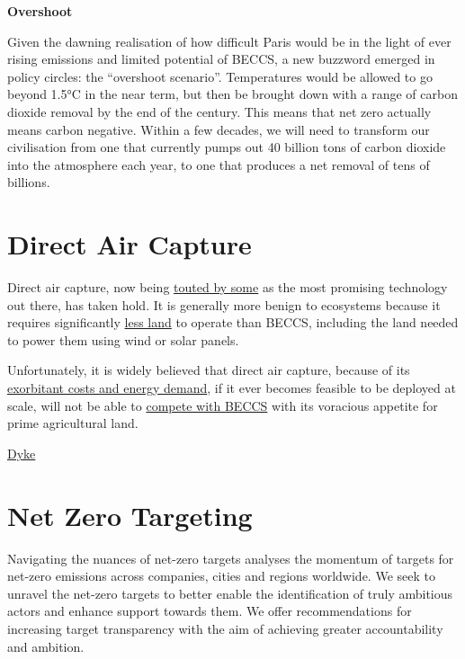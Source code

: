 \documentclass[
]{book}
\begin{document}
\textbf{Overshoot}

Given the dawning realisation of how difficult Paris would be in the light of ever rising emissions and limited potential of BECCS, a new buzzword emerged in policy circles: the ``overshoot scenario''. Temperatures would be allowed to go beyond 1.5°C in the near term, but then be brought down with a range of carbon dioxide removal by the end of the century. This means that net zero actually means carbon negative. Within a few decades, we will need to transform our civilisation from one that currently pumps out 40 billion tons of carbon dioxide into the atmosphere each year, to one that produces a net removal of tens of billions.

\hypertarget{direct-air-capture}{%
\section{Direct Air Capture}\label{direct-air-capture}}

Direct air capture, now being \href{https://www.wri.org/blog/2020/03/to-unlock-the-potential-of-direct-air-capture-we-must-invest-now}{touted by some} as the most promising technology out there, has taken hold. It is generally more benign to ecosystems because it requires significantly \href{https://hoffmanncentre.chathamhouse.org/article/betting-on-beccs-exploring-land-based-negative-emissions-technologies/}{less land} to operate than BECCS, including the land needed to power them using wind or solar panels.

Unfortunately, it is widely believed that direct air capture, because of its \href{https://www.wri.org/blog/2021/01/direct-air-capture-definition-cost-considerations}{exorbitant costs and energy demand}, if it ever becomes feasible to be deployed at scale, will not be able to \href{https://www.nature.com/articles/s41558-020-0885-y}{compete with BECCS} with its voracious appetite for prime agricultural land.

\href{https://theconversation.com/climate-scientists-concept-of-net-zero-is-a-dangerous-trap-157368}{Dyke}

\hypertarget{net-zero-targeting}{%
\section{Net Zero Targeting}\label{net-zero-targeting}}

Navigating the nuances of net-zero targets
analyses the momentum of targets for net-zero
emissions across companies, cities and regions
worldwide. We seek to unravel the net-zero
targets to better enable the identification of truly
ambitious actors and enhance support towards
them. We offer recommendations for increasing
target transparency with the aim of achieving
greater accountability and ambition.
\end{document}
